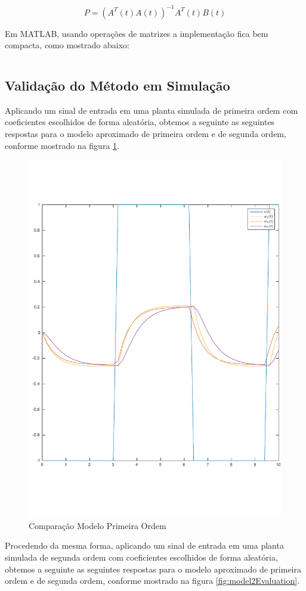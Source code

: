 \documentclass[a4paper,11pt]{article}
\begin{document}
\begin{equation}
    P = \left(A^T(t) A(t)\right)^{-1} A^T(t) B(t)
\end{equation}

Em MATLAB, usando operações de matrizes a implementação fica bem compacta, como mostrado abaixo:

\inputminted{matlab}{../src/matlab/secondordertf.m}

\subsection{Validação do Método em Simulação}

Aplicando um sinal de entrada em uma planta simulada de primeira ordem com coeficientes escolhidos de forma aleatória, obtemos a seguinte as seguintes respostas para o modelo aproximado de primeira ordem e de segunda ordem, conforme mostrado na figura \ref{fig:model1Evaluation}.

\begin{figure}[H]
    \centering
    \includegraphics[width=0.6\linewidth]{tex/img/model1Evaluation.pdf}
    \caption{Comparação Modelo Primeira Ordem}
    \label{fig:model1Evaluation}
\end{figure}

Procedendo da mesma forma, aplicando um sinal de entrada em uma planta simulada de segunda ordem com coeficientes escolhidos de forma aleatória, obtemos a seguinte as seguintes respostas para o modelo aproximado de primeira ordem e de segunda ordem, conforme mostrado na figura \ref{fig:model2Evaluation}.
\end{document}
